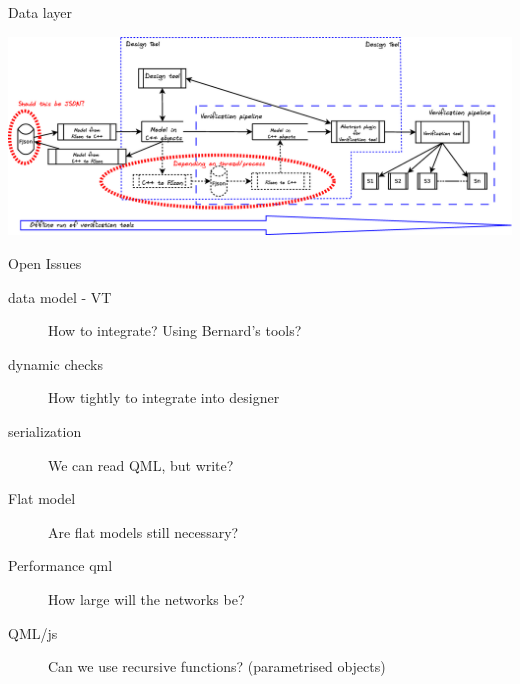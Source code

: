 \documentclass[11pt]{beamer}
\begin{document}
\begin{frame}{Data layer}

	\includegraphics[width=.95\linewidth]{architecture-tool-scope}

\end{frame}

\begin{frame}{Open Issues}
	\begin{description}
		\item[data model - VT] How to integrate? Using Bernard's tools? 
		\item[dynamic checks] How tightly to integrate into designer
		\item[serialization] We can read QML,  but write?
		\item[Flat model] Are flat models still necessary?
		\item[Performance qml] How large will the networks be?
		\item[QML/js] Can we use recursive functions? (parametrised objects)
	\end{description}
\end{frame}
\end{document}
